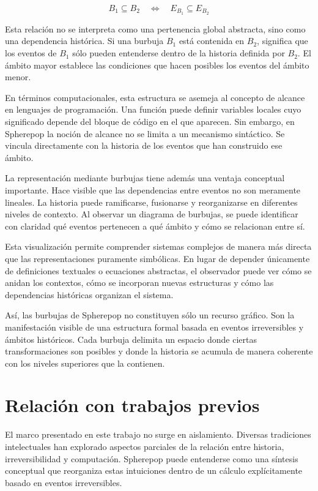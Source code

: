 \documentclass[12pt]{article}
\begin{document}
\[
B_1 \subseteq B_2 \quad \Longleftrightarrow \quad E_{B_1} \subseteq E_{B_2}
\]

Esta relación no se interpreta como una pertenencia global abstracta, sino como una dependencia histórica. Si una burbuja \(B_1\) está contenida en \(B_2\), significa que los eventos de \(B_1\) sólo pueden entenderse dentro de la historia definida por \(B_2\). El ámbito mayor establece las condiciones que hacen posibles los eventos del ámbito menor.

En términos computacionales, esta estructura se asemeja al concepto de alcance en lenguajes de programación. Una función puede definir variables locales cuyo significado depende del bloque de código en el que aparecen. Sin embargo, en Spherepop la noción de alcance no se limita a un mecanismo sintáctico. Se vincula directamente con la historia de los eventos que han construido ese ámbito.

La representación mediante burbujas tiene además una ventaja conceptual importante. Hace visible que las dependencias entre eventos no son meramente lineales. La historia puede ramificarse, fusionarse y reorganizarse en diferentes niveles de contexto. Al observar un diagrama de burbujas, se puede identificar con claridad qué eventos pertenecen a qué ámbito y cómo se relacionan entre sí.

Esta visualización permite comprender sistemas complejos de manera más directa que las representaciones puramente simbólicas. En lugar de depender únicamente de definiciones textuales o ecuaciones abstractas, el observador puede ver cómo se anidan los contextos, cómo se incorporan nuevas estructuras y cómo las dependencias históricas organizan el sistema.

Así, las burbujas de Spherepop no constituyen sólo un recurso gráfico. Son la manifestación visible de una estructura formal basada en eventos irreversibles y ámbitos históricos. Cada burbuja delimita un espacio donde ciertas transformaciones son posibles y donde la historia se acumula de manera coherente con los niveles superiores que la contienen.

\section{Relación con trabajos previos}

El marco presentado en este trabajo no surge en aislamiento. Diversas tradiciones intelectuales han explorado aspectos parciales de la relación entre historia, irreversibilidad y computación. Spherepop puede entenderse como una síntesis conceptual que reorganiza estas intuiciones dentro de un cálculo explícitamente basado en eventos irreversibles.
\end{document}
